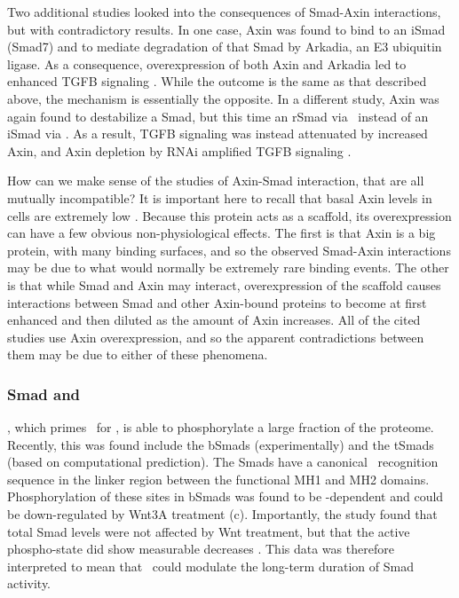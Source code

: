 Two additional studies looked into the consequences
of Smad-Axin interactions, but with contradictory results.
In one case, Axin was found
to bind to an iSmad (Smad7) and to mediate degradation
of that Smad by Arkadia, an E3 ubiquitin ligase. As
a consequence, overexpression of both Axin and Arkadia
led to enhanced TGFB signaling \cite{Liu2006b}. While
the outcome is the same as that described above, the
mechanism is essentially the opposite. In
a different study, Axin was again found to destabilize
a Smad, but this time an rSmad via \gsk\
instead of an iSmad via \ubn. As a result, TGFB signaling was instead
attenuated by increased Axin, and
Axin depletion by RNAi amplified TGFB signaling \cite{Guo2008}.


How can we make sense of the studies of Axin-Smad
interaction, that are all mutually incompatible? It is important
here to recall that basal Axin levels in cells are extremely
low \cite{Lee2003}. Because this protein acts as a scaffold,
its overexpression can have a few obvious non-physiological
effects. The first is that Axin is a big protein, with many
binding surfaces, and so the observed Smad-Axin interactions
may be due to what would normally be extremely rare binding
events. The other is that while Smad and Axin may interact,
overexpression of the scaffold causes interactions between Smad and other
Axin-bound proteins to become at first enhanced and then diluted
as the amount of Axin increases. All of the cited studies use
Axin overexpression, and so the apparent contradictions between them
may be due to either of these phenomena.



\subsubsection{Smad and \gsk}
\label{pathways:wntTgfb:gsk}

\gsk, which primes \bcat\ for \ubn, is able to phosphorylate a large
fraction of the proteome. Recently, this was found include the bSmads
(experimentally) and the tSmads (based on computational prediction).
The Smads have a canonical \gsk\ recognition sequence in the linker region
between the functional MH1 and MH2 domains. Phosphorylation of these sites
in bSmads was found to be \gsk-dependent and could be 
down-regulated by Wnt3A treatment (c). Importantly, the study
found that total Smad levels were not affected by Wnt treatment, but
that the active phospho-state did show measurable decreases \cite{Fuentealba2007}.
This data was therefore interpreted to mean that \gsk\ could modulate
the long-term duration of Smad activity.


